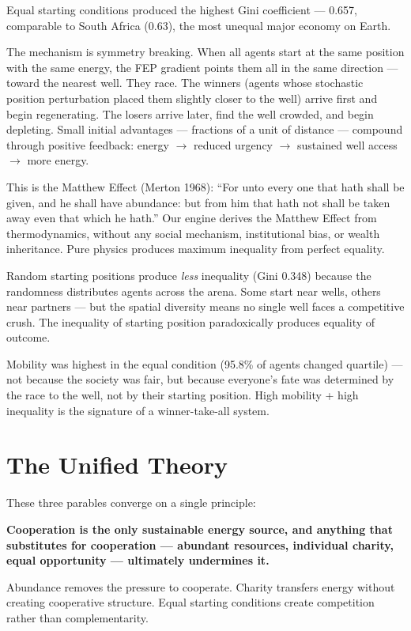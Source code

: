 Equal starting conditions produced the highest Gini coefficient --- 0.657, comparable to South Africa (0.63), the most unequal major economy on Earth.

The mechanism is symmetry breaking. When all agents start at the same position with the same energy, the FEP gradient points them all in the same direction --- toward the nearest well. They race. The winners (agents whose stochastic position perturbation placed them slightly closer to the well) arrive first and begin regenerating. The losers arrive later, find the well crowded, and begin depleting. Small initial advantages --- fractions of a unit of distance --- compound through positive feedback: energy $\to$ reduced urgency $\to$ sustained well access $\to$ more energy.

This is the Matthew Effect (Merton 1968): ``For unto every one that hath shall be given, and he shall have abundance: but from him that hath not shall be taken away even that which he hath.'' Our engine derives the Matthew Effect from thermodynamics, without any social mechanism, institutional bias, or wealth inheritance. Pure physics produces maximum inequality from perfect equality.

Random starting positions produce \emph{less} inequality (Gini 0.348) because the randomness distributes agents across the arena. Some start near wells, others near partners --- but the spatial diversity means no single well faces a competitive crush. The inequality of starting position paradoxically produces equality of outcome.

Mobility was highest in the equal condition (95.8\% of agents changed quartile) --- not because the society was fair, but because everyone's fate was determined by the race to the well, not by their starting position. High mobility + high inequality is the signature of a winner-take-all system.

\section{The Unified Theory}\label{the-unified-theory}

These three parables converge on a single principle:

\textbf{Cooperation is the only sustainable energy source, and anything that substitutes for cooperation --- abundant resources, individual charity, equal opportunity --- ultimately undermines it.}

Abundance removes the pressure to cooperate. Charity transfers energy without creating cooperative structure. Equal starting conditions create competition rather than complementarity.

